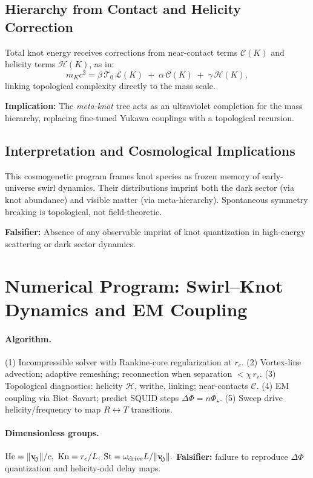 \documentclass[10pt,reprint,aps,onecolumn,nofootinbib]{revtex4-2}
\newcommand{\vswirl}{\mathbf{v}_{\!\mkern-2mu\scriptscriptstyle\boldsymbol{\circlearrowleft}}}
\newcommand{\rc}{r_c}                                    %
\begin{document}
        \subsection{Hierarchy from Contact and Helicity Correction}
        Total knot energy receives corrections from near-contact terms \(\mathcal{C}(K)\) and helicity terms \(\mathcal{H}(K)\), as in:
        \[
            m_K c^2 = \beta\,\mathcal{T}_0\,\mathcal{L}(K)\;+\;\alpha\,\mathcal{C}(K)\;+\;\gamma\,\mathcal{H}(K),
        \]
        linking topological complexity directly to the mass scale.

        \textbf{Implication:} The \emph{meta-knot} tree acts as an ultraviolet completion for the mass hierarchy, replacing fine-tuned Yukawa couplings with a topological recursion.

        \subsection{Interpretation and Cosmological Implications}
        This cosmogenetic program frames knot species as frozen memory of early-universe swirl dynamics. Their distributions imprint both the dark sector (via knot abundance) and visible matter (via meta-hierarchy). Spontaneous symmetry breaking is topological, not field-theoretic.

        \textbf{Falsifier:} Absence of any observable imprint of knot quantization in high-energy scattering or dark sector dynamics.



    \section{Numerical Program: Swirl–Knot Dynamics and EM Coupling}
    \label{sec:SST-sim}

    \paragraph{Algorithm.}
        (1) Incompressible solver with Rankine-core regularization at \(\rc\).
        (2) Vortex-line advection; adaptive remeshing; reconnection when separation \(<\chi\,\rc\).
        (3) Topological diagnostics: helicity \(\mathcal{H}\), writhe, linking; near-contacts \(\mathcal{C}\).
        (4) EM coupling via Biot–Savart; predict SQUID steps \(\Delta\Phi=n\Phi_\star\).
        (5) Sweep drive helicity/frequency to map \(R\leftrightarrow T\) transitions.

    \paragraph{Dimensionless groups.}
        \(\mathrm{He}=\lVert\vswirl\rVert/c,\ \mathrm{Kn}=\rc/L,\)
        \(\mathrm{St}=\omega_{\text{drive}} L/\lVert\vswirl\rVert.\)
        \textbf{Falsifier:} failure to reproduce \(\Delta\Phi\) quantization and helicity-odd delay maps.
\end{document}
